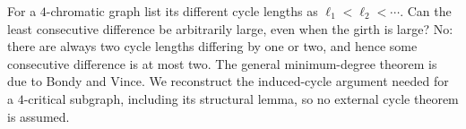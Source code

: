 For a $4$-chromatic graph list its different cycle lengths as $\ell_1<\ell_2<\cdots$. Can the least consecutive difference be arbitrarily large, even when the girth is large? No: there are always two cycle lengths differing by one or two, and hence some consecutive difference is at most two.
The general minimum-degree theorem is due to Bondy and Vince. We reconstruct the induced-cycle argument needed for a $4$-critical subgraph, including its structural lemma, so no external cycle theorem is assumed.
